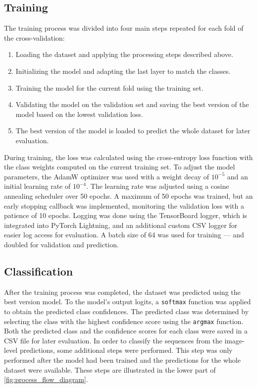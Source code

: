     \subsection{Training}
    The training process was divided into four main steps repeated for each fold of the cross-validation:
    \begin{enumerate}
        \item Loading the dataset and applying the processing steps described above.
        \item Initializing the model and adapting the last layer to match the classes.
        \item Training the model for the current fold using the training set.
        \item Validating the model on the validation set and saving the best version of the model based on the lowest validation loss.
        \item The best version of the model is loaded to predict the whole dataset for later evaluation.
    \end{enumerate}

    During training, the loss was calculated using the cross-entropy loss function with the class weights computed on the current training set.
    To adjust the model parameters, the AdamW optimizer \autocite{loshchilovDecoupledWeightDecay2019} was used with a weight decay of \(10^{-5}\) and an initial learning rate of \(10^{-4}\).
    The learning rate was adjusted using a cosine annealing scheduler \autocite{loshchilovSGDRStochasticGradient2017} over 50 epochs.
    A maximum of 50 epochs was trained, but an early stopping callback was implemented, monitoring the validation loss with a patience of 10 epochs.
    Logging was done using the TensorBoard logger, which is integrated into PyTorch Lightning, and an additional custom \ac{CSV} logger for easier log access for evaluation.
    A batch size of 64 was used for training --- and doubled for validation and prediction.

    \subsection{Classification}
    After the training process was completed, the dataset was predicted using the best version model.
    To the model's output logits, a \texttt{softmax} function was applied to obtain the predicted class confidences.
    The predicted class was determined by selecting the class with the highest confidence score using the \texttt{argmax} function.
    Both the predicted class and the confidence scores for each class were saved in a \ac{CSV} file for later evaluation.
    In order to classify the sequences from the image-level predictions, some additional steps were performed.
    This step was only performed after the model had been trained and the predictions for the whole dataset were available.
    These steps are illustrated in the lower part of \autoref{fig:process_flow_diagram}.

